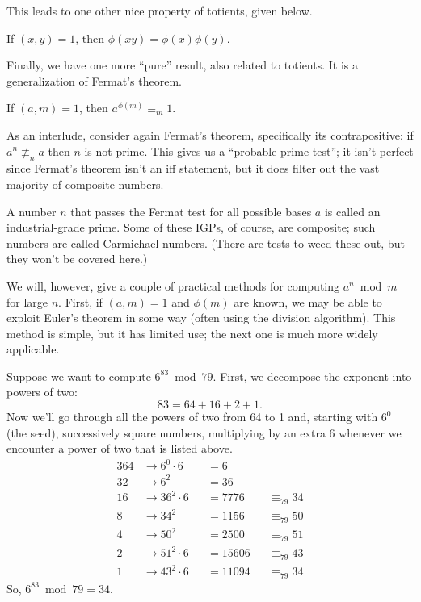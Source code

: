 \documentclass[../m55main.tex]{chapters}
\begin{document}
This leads to one other nice property of totients, given below.

\begin{corollary}
    If $(x,y) = 1$, then $\phi (xy) = \phi (x) \phi (y)$.
\end{corollary}

Finally, we have one more ``pure'' result, also related to totients.
It is a generalization of Fermat's theorem.

\begin{theorem}
    If $(a,m) = 1$, then $a^{\phi (m)} \equiv_m 1$.
\end{theorem}


As an interlude, consider again Fermat's theorem, specifically its contrapositive: if $a^n \not\equiv_n a$ then $n$ is not prime.
This gives us a ``probable prime test''; it isn't perfect since Fermat's theorem isn't an iff statement, but it does filter out the vast majority of composite numbers.

A number $n$ that passes the Fermat test for all possible bases $a$ is called an industrial-grade prime.
Some of these IGPs, of course, are composite; such numbers are called Carmichael numbers.
(There are tests to weed these out, but they won't be covered here.)

We will, however, give a couple of practical methods for computing $a^n \bmod m$ for large $n$.
First, if $(a,m) = 1$ and $\phi (m)$ are known, we may be able to exploit Euler's theorem in some way (often using the division algorithm).
This method is simple, but it has limited use; the next one is much more widely applicable.

\begin{example}
    Suppose we want to compute $6^{83} \bmod 79$.
    First, we decompose the exponent into powers of two:
    \[ 83 = 64 + 16 + 2 + 1. \]
    Now we'll go through all the powers of two from 64 to 1 and, starting with $6^0$ (the seed), successively square numbers, multiplying by an extra 6 whenever we encounter a power of two that is listed above.
    \begin{alignat*}{3}
        \boxed{64} &\rightarrow 6^0 \cdot 6 &&= 6 \\
        32 &\rightarrow 6^2 &&= 36 \\
        \boxed{16} &\rightarrow 36^2 \cdot 6 &&= 7776 &&\equiv_{79} 34 \\
        8 &\rightarrow 34^2 &&= 1156 &&\equiv_{79} 50 \\
        4 &\rightarrow 50^2 &&= 2500 &&\equiv_{79} 51 \\
        \boxed{2} &\rightarrow 51^2 \cdot 6 &&= 15606 &&\equiv_{79} 43 \\
        \boxed{1} &\rightarrow 43^2 \cdot 6 &&= 11094 &&\equiv_{79} 34
    \end{alignat*}
    So, $6^{83} \bmod 79 = 34$.
\end{example}
\end{document}
